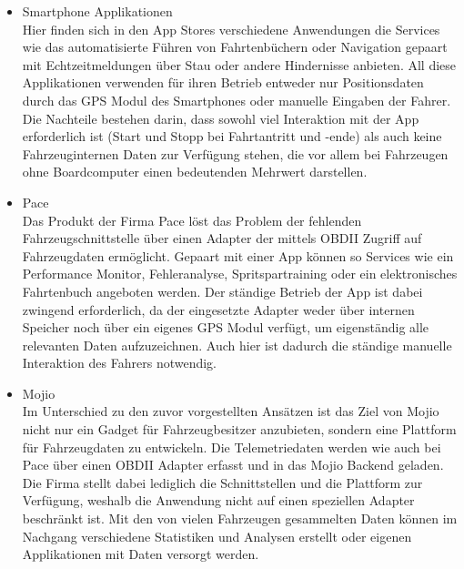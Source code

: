 \begin{itemize}
\item Smartphone Applikationen \\
Hier finden sich in den App Stores verschiedene Anwendungen die Services wie das automatisierte Führen von Fahrtenbüchern\cite{MCT2016} oder Navigation gepaart mit Echtzeitmeldungen über Stau oder andere Hindernisse anbieten\cite{Mobile2006}. All diese Applikationen verwenden für ihren Betrieb entweder nur Positionsdaten durch das \ac{GPS} Modul des Smartphones oder manuelle Eingaben der Fahrer. Die Nachteile bestehen darin, dass sowohl viel Interaktion mit der App erforderlich ist (Start und Stopp bei Fahrtantritt und -ende) als auch keine Fahrzeuginternen Daten zur Verfügung stehen, die vor allem bei Fahrzeugen ohne Boardcomputer einen bedeutenden Mehrwert darstellen.
\item Pace\cite{GmbH2018}\\
Das Produkt der Firma Pace löst das Problem der fehlenden Fahrzeugschnittstelle über einen Adapter der mittels \ac{OBD}II Zugriff auf Fahrzeugdaten ermöglicht. Gepaart mit einer App können so Services wie ein Performance Monitor, Fehleranalyse, Spritspartraining oder ein elektronisches Fahrtenbuch angeboten werden. Der ständige Betrieb der App ist dabei zwingend erforderlich, da der eingesetzte Adapter weder über internen Speicher noch über ein eigenes GPS Modul verfügt, um eigenständig alle relevanten Daten aufzuzeichnen. Auch hier ist dadurch die ständige manuelle Interaktion des Fahrers notwendig.
\item Mojio\cite{mojio2018}\\
Im Unterschied zu den zuvor vorgestellten Ansätzen ist das Ziel von Mojio nicht nur ein Gadget für Fahrzeugbesitzer anzubieten, sondern eine Plattform für Fahrzeugdaten zu entwickeln. Die Telemetriedaten werden wie auch bei Pace über einen OBDII Adapter erfasst und in das Mojio Backend geladen. Die Firma stellt dabei lediglich die Schnittstellen und die Plattform zur Verfügung, weshalb die Anwendung nicht auf einen speziellen Adapter beschränkt ist. Mit den von vielen Fahrzeugen gesammelten Daten können im Nachgang verschiedene Statistiken und Analysen erstellt oder eigenen Applikationen mit Daten versorgt werden.
\end{itemize}

